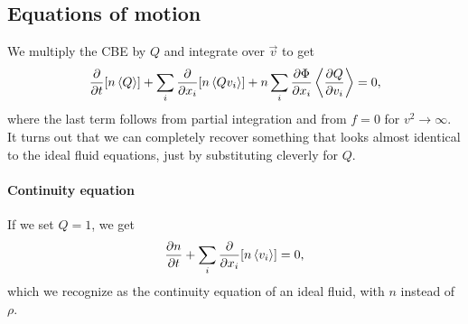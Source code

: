 \subsection{Equations of motion}
\label{ssec:collisionless-eom}

We multiply the CBE by $Q$ and integrate over $\vec{v}$ to get
\begin{align*}
	\pdv{}{t} [n \left\langle Q \right\rangle]
	+ \sum_{i} \pdv{}{x_i}[n \left\langle Q v_i \right\rangle]
	+ n \sum_{i} \pdv{\Phi}{x_i} \left\langle  \pdv{Q}{v_i}  \right\rangle
	= 0,
\end{align*}
where the last term follows from partial integration and from $f=0$ for $v^2 \to \infty$.
It turns out that we can completely recover something that looks almost identical to the ideal fluid equations, just by substituting cleverly for $Q$.

\paragraph*{Continuity equation}
If we set $Q = 1$, we get
\begin{align*}
	\pdv{n}{t} + \sum_{i} \pdv{}{x_i} [n \left\langle v_i \right\rangle]
	= 0,
\end{align*}
which we recognize as the continuity equation of an ideal fluid, with $n$ instead of $\rho$.

